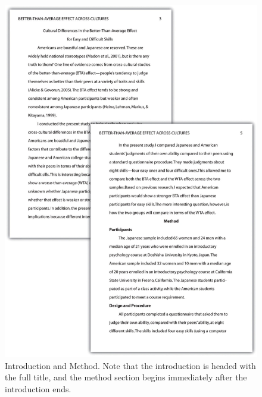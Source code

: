 \begin{figure}
\includegraphics[width=\linewidth]{figures/113}
\caption{Introduction and Method. Note that the introduction is headed with the full title, and the method section begins immediately after the introduction ends.}
\label{fig:p2}
\end{figure}

